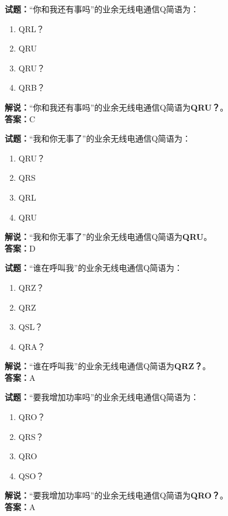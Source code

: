 \documentclass{ctexbook}
\begin{document}
\bigskip


\noindent\textbf{试题：}“你和我还有事吗”的业余无线电通信Q简语为：
\begin{enumerate}[leftmargin=3em]
\item QRL？
\item QRU
\item QRU？
\item QRB？
\end{enumerate}
\noindent\textbf{解说：}“你和我还有事吗”的业余无线电通信Q简语为\textbf{QRU？}。\\\noindent\textbf{答案：}C


\bigskip


\noindent\textbf{试题：}“我和你无事了”的业余无线电通信Q简语为：
\begin{enumerate}[leftmargin=3em]
\item QRU？
\item QRS
\item QRL
\item QRU
\end{enumerate}
\noindent\textbf{解说：}“我和你无事了”的业余无线电通信Q简语为\textbf{QRU}。\\\noindent\textbf{答案：}D



\bigskip


\noindent\textbf{试题：}“谁在呼叫我”的业余无线电通信Q简语为：
\begin{enumerate}[leftmargin=3em]
\item QRZ？
\item QRZ
\item QSL？
\item QRA？
\end{enumerate}
\noindent\textbf{解说：}“谁在呼叫我”的业余无线电通信Q简语为\textbf{QRZ？}。\\\noindent\textbf{答案：}A

\bigskip


\noindent\textbf{试题：}“要我增加功率吗”的业余无线电通信Q简语为：
\begin{enumerate}[leftmargin=3em]
\item QRO？
\item QRS？
\item QRO
\item QSO？
\end{enumerate}
\noindent\textbf{解说：}“要我增加功率吗”的业余无线电通信Q简语为\textbf{QRO？}。\\\noindent\textbf{答案：}A


\bigskip
\end{document}
